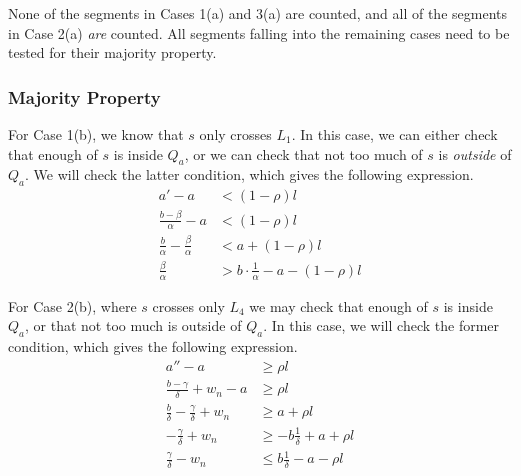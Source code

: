 None of the segments in Cases 1(a) and 3(a) are counted, and all of the segments in Case 2(a) \emph{are} counted. All segments falling into the remaining cases need to be tested for their majority property.


\subsubsection{Majority Property}

For Case 1(b), we know that $s$ only crosses $L_1$. In this case, we can either check that enough of $s$ is inside $Q_a$, or we can check that not too much of $s$ is \emph{outside} of $Q_a$.  We will check the latter condition, which gives the following expression.
\[
\begin{split}
a' - a &< (1 - \rho)l \\
%
\frac{b - \beta}{\alpha} - a &< (1 - \rho)l \\
%
\frac{b}{\alpha} - \frac{\beta}{\alpha} &< a + (1 - \rho)l \\
%
\frac{\beta}{\alpha} &> b\cdot \frac{1}{\alpha} - a - (1-\rho)l
%
\end{split}
\]

\noindent For Case 2(b), where $s$ crosses only $L_4$ we may check that enough of $s$ is inside $Q_a$, or that not too much is outside of $Q_a$. In this case, we will check the former condition, which gives the following expression.
\[
\begin{split}
a'' - a &\geq \rho l \\
%
\frac{b - \gamma}{\delta} + w_n - a &\geq \rho l \\
%
\frac{b}{\delta} - \frac{\gamma}{\delta} + w_n &\geq a + \rho l \\
%
- \frac{\gamma}{\delta} + w_n &\geq -b \frac{1}{\delta} + a + \rho l \\
%
\frac{\gamma}{\delta} - w_n &\leq b \frac{1}{\delta} - a - \rho l \\
%
\end{split}
\]

